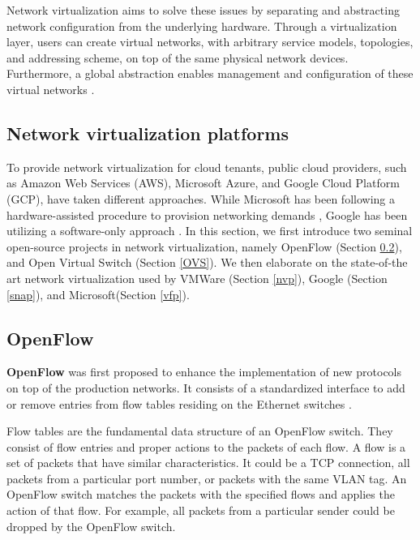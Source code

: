 Network virtualization aims to solve these issues by separating and abstracting 
network configuration from the underlying hardware.
Through a virtualization layer, users can create virtual networks, with arbitrary service 
models, topologies, and addressing scheme, on top of the same physical network devices. Furthermore, 
a global abstraction enables management and configuration of these virtual networks 
\cite{mckeown2008openflow}.


\subsection{Network virtualization platforms}
\label{sec:network.virt.platform}

To provide network virtualization for cloud tenants, public cloud providers, such as Amazon 
Web Services (AWS), Microsoft Azure, and Google Cloud Platform (GCP), have taken different 
approaches. While Microsoft has been following a hardware-assisted procedure to provision 
networking demands \cite{firestone2018azure, firestone2017vfp}, Google has been utilizing 
a software-only approach \cite{marty2019snap}. In this section, we first introduce two seminal 
open-source projects in network virtualization, namely OpenFlow (Section \ref{OpenFlow}), 
and Open Virtual Switch (Section \ref{OVS}). We then elaborate on the state-of-the art network 
virtualization used by VMWare (Section \ref{nvp}), Google (Section \ref{snap}), and 
Microsoft(Section \ref{vfp}).

\subsection{OpenFlow}
\label{OpenFlow}
\textbf{OpenFlow} was first proposed to enhance the implementation of new protocols on top 
of the production networks. It consists of a standardized interface to add or remove entries 
from flow tables residing on the Ethernet switches \cite{mckeown2008openflow}.

Flow tables are the fundamental data structure of an OpenFlow switch. They consist of flow 
entries and proper actions to the packets of each flow. A flow is a set of packets that have 
similar characteristics. It could be a TCP connection, all packets from a particular port 
number, or packets with the same VLAN tag. An OpenFlow switch matches the packets with the 
specified flows and applies the action of that flow. For example, all packets from a 
particular sender could be dropped by the OpenFlow switch. 

